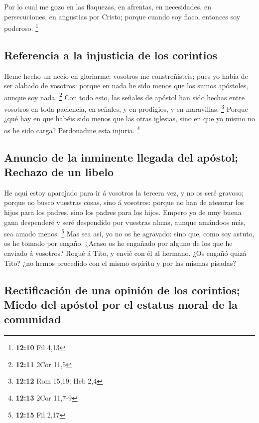  Por lo cual me gozo en las flaquezas, en afrentas, en
necesidades, en persecuciones, en angustias por Cristo; porque cuando
soy flaco, entonces soy poderoso. \footnote{\textbf{12:10} Fil 4,13}

\hypertarget{referencia-a-la-injusticia-de-los-corintios}{%
\subsection{Referencia a la injusticia de los
corintios}\label{referencia-a-la-injusticia-de-los-corintios}}

 Heme hecho un necio en gloriarme: vosotros me
constreñisteis; pues yo había de ser alabado de vosotros: porque en nada
he sido menos que los sumos apóstoles, aunque soy nada. \footnote{\textbf{12:11}
  2Cor 11,5}  Con todo esto, las señales de apóstol han
sido hechas entre vosotros en toda paciencia, en señales, y en
prodigios, y en maravillas. \footnote{\textbf{12:12} Rom 15,19; Heb 2,4}
 Porque ¿qué hay en que habéis sido menos que las otras
iglesias, sino en que yo mismo no os he sido carga? Perdonadme esta
injuria. \footnote{\textbf{12:13} 2Cor 11,7-9}

\hypertarget{anuncio-de-la-inminente-llegada-del-apuxf3stol-rechazo-de-un-libelo}{%
\subsection{Anuncio de la inminente llegada del apóstol; Rechazo de un
libelo}\label{anuncio-de-la-inminente-llegada-del-apuxf3stol-rechazo-de-un-libelo}}

 He aquí estoy aparejado para ir á vosotros la tercera vez,
y no os seré gravoso; porque no busco vuestras cosas, sino á vosotros:
porque no han de atesorar los hijos para los padres, sino los padres
para los hijos.  Empero yo de muy buena gana despenderé y
seré despendido por vuestras almas, aunque amándoos más, sea amado
menos. \footnote{\textbf{12:15} Fil 2,17}  Mas sea así, yo
no os he agravado: sino que, como soy astuto, os he tomado por engaño.
 ¿Acaso os he engañado por alguno de los que he enviado á
vosotros?  Rogué á Tito, y envié con él al hermano. ¿Os
engañó quizá Tito? ¿no hemos procedido con el mismo espíritu y por las
mismas pisadas?

\hypertarget{rectificaciuxf3n-de-una-opiniuxf3n-de-los-corintios-miedo-del-apuxf3stol-por-el-estatus-moral-de-la-comunidad}{%
\subsection{Rectificación de una opinión de los corintios; Miedo del
apóstol por el estatus moral de la
comunidad}\label{rectificaciuxf3n-de-una-opiniuxf3n-de-los-corintios-miedo-del-apuxf3stol-por-el-estatus-moral-de-la-comunidad}}

